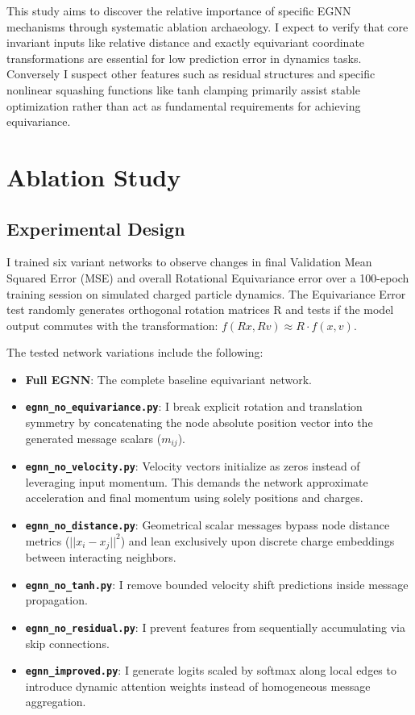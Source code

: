 \documentclass{article}
\begin{document}
This study aims to discover the relative importance of specific EGNN mechanisms through systematic ablation archaeology. I expect to verify that core invariant inputs like relative distance and exactly equivariant coordinate transformations are essential for low prediction error in dynamics tasks. Conversely I suspect other features such as residual structures and specific nonlinear squashing functions like tanh clamping primarily assist stable optimization rather than act as fundamental requirements for achieving equivariance. 

\section{Ablation Study}

\subsection{Experimental Design}

I trained six variant networks to observe changes in final Validation Mean Squared Error (MSE) and overall Rotational Equivariance error over a 100-epoch training session on simulated charged particle dynamics. The Equivariance Error test randomly generates orthogonal rotation matrices R and tests if the model output commutes with the transformation: $f(Rx, Rv) \approx R \cdot f(x, v)$.

The tested network variations include the following:
\begin{itemize}
    \item \textbf{Full EGNN}: The complete baseline equivariant network.
    \item \textbf{\texttt{egnn\_no\_equivariance.py}}: I break explicit rotation and translation symmetry by concatenating the node absolute position vector into the generated message scalars ($m_{ij}$).
    \item \textbf{\texttt{egnn\_no\_velocity.py}}: Velocity vectors initialize as zeros instead of leveraging input momentum. This demands the network approximate acceleration and final momentum using solely positions and charges.
    \item \textbf{\texttt{egnn\_no\_distance.py}}: Geometrical scalar messages bypass node distance metrics ($||x_i - x_j||^2$) and lean exclusively upon discrete charge embeddings between interacting neighbors.
    \item \textbf{\texttt{egnn\_no\_tanh.py}}: I remove bounded velocity shift predictions inside message propagation.
    \item \textbf{\texttt{egnn\_no\_residual.py}}: I prevent features from sequentially accumulating via skip connections.
    \item \textbf{\texttt{egnn\_improved.py}}: I generate logits scaled by softmax along local edges to introduce dynamic attention weights instead of homogeneous message aggregation.
\end{itemize}
\end{document}
